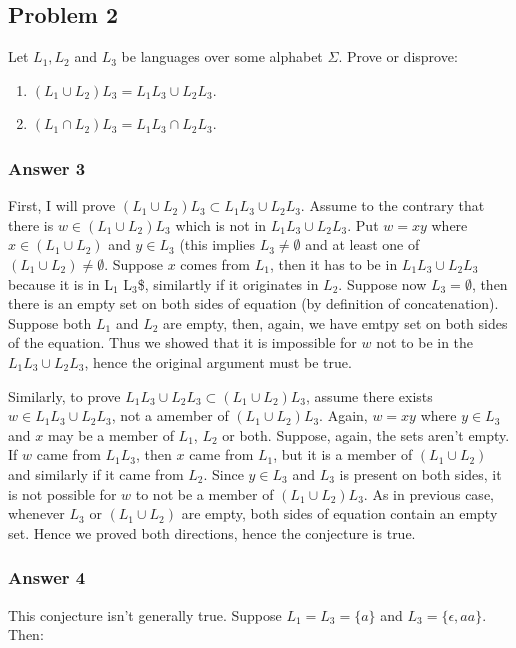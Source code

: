 \documentclass[11pt]{article}
\begin{document}
\subsection{Problem 2}
\label{sec:orgheadline6}
Let \(L_1, L_2\) and \(L_3\) be languages over some alphabet \(\Sigma\).
Prove or disprove:
\begin{enumerate}
\item \((L_1 \cup L_2) L_3 = L_1 L_3 \cup L_2 L_3\).
\item \((L_1 \cap L_2) L_3 = L_1 L_3 \cap L_2 L_3\).
\end{enumerate}

\subsubsection{Answer 3}
\label{sec:orgheadline4}
First, I will prove \((L_1 \cup L_2) L_3 \subset L_1 L_3 \cup L_2 L_3\).
Assume to the contrary that there is \(w \in (L_1 \cup L_2) L_3\) which is not
in \(L_1 L_3 \cup L_2 L_3\).  Put \(w = xy\) where \(x \in (L_1 \cup L_2)\) and \(y
    \in L_3\) (this implies \(L_3 \neq \emptyset\) and at least one of \((L_1 \cup
    L_2) \neq \emptyset\).  Suppose \(x\) comes from \(L_1\), then it has to be in
\(L_1 L_3 \cup L_2 L_3\) because it is in L\(_{\text{1}}\) L\(_{\text{3}}\)\$, similartly if it originates
in \(L_2\).  Suppose now \(L_3 = \emptyset\), then there is an empty set on
both sides of equation (by definition of concatenation).  Suppose both \(L_1\)
and \(L_2\) are empty, then, again, we have emtpy set on both sides of the
equation.  Thus we showed that it is impossible for \(w\) not to be in the
\(L_1 L_3 \cup L_2 L_3\), hence the original argument must be true.

Similarly, to prove \(L_1 L_3 \cup L_2 L_3 \subset (L_1 \cup L_2) L_3\),
assume there exists \(w \in L_1 L_3 \cup L_2 L_3\), not a amember of \((L_1
    \cup L_2) L_3\).  Again, \(w = xy\) where \(y \in L_3\) and \(x\) may be a
member of \(L_1\), \(L_2\) or both.  Suppose, again, the sets aren't empty.
If \(w\) came from \(L_1 L_3\), then \(x\) came from \(L_1\), but it is a member
of \((L_1 \cup L_2)\) and similarly if it came from \(L_2\).  Since \(y \in L_3\)
and \(L_3\) is present on both sides, it is not possible for \(w\) to not
be a member of \((L_1 \cup L_2) L_3\).  As in previous case, whenever \(L_3\)
or \((L_1 \cup L_2)\) are empty, both sides of equation contain an empty set.
Hence we proved both directions, hence the conjecture is true.

\subsubsection{Answer 4}
\label{sec:orgheadline5}
This conjecture isn't generally true.  Suppose \(L_1 = L_3 = \{a\}\) and
\(L_3 = \{\epsilon, aa\}\).  Then:
\end{document}
